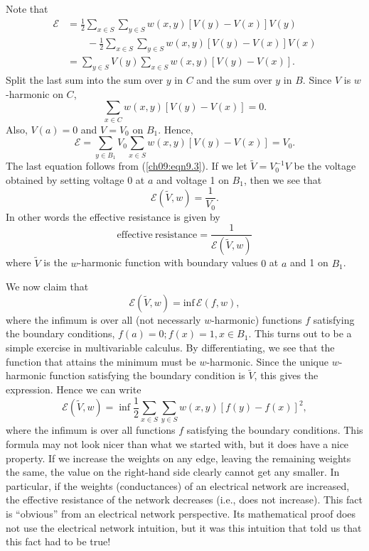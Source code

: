 \documentclass{stml-l}
\theoremstyle{definition}
\numberwithin{equation}{chapter}
\numberwithin{figure}{chapter}
\numberwithin{figure}{section}
\begin{document}
Note that
\begin{align*}
\mathcal{E}&=\frac{1}{2}\sum\limits_{x\in S}\sum\limits_{y\in
S}w(x,y)[V(y)-V(x)]V(y)\\
&\quad\quad-\frac{1}{2}\sum\limits_{x\in S}\sum\limits_{y\in S}w(x,y)[V(y)-V(x)]V(x)\\
&=\sum\limits_{y\in S}V(y)\sum\limits_{x\in S}w(x,y)[V(y)-V(x)].
\end{align*}
Split the last sum into the sum over $y$ in $C$ and the sum over $y$
in $B$. Since $V$ is $w$-harmonic on $C$,
\begin{equation*}
\sum\limits_{x\in C}w(x,y)[V(y)-V(x)]=0.
\end{equation*}
Also, $V(a)=0$ and $V=V_{0}$ on $B_{1}$. Hence,
\begin{equation*}
\mathcal{E}=\sum\limits_{y\in B_{1}}V_{0}\sum\limits_{x\in
S}w(x,y)[V(y)-V(x)]=V_{0}.
\end{equation*}
The last equation follows from (\ref{ch09:eqn9.3}). If we let
$\tilde{V}=V_{0}^{-1}V$ be the voltage obtained by setting voltage
$0$ at $a$ and voltage 1 on $B_{1}$, then we see that
\begin{equation*}
\mathcal{E}(\tilde{V},w)=\frac{1}{V_{0}}.
\end{equation*}
In other words the effective resistance is given by
\begin{equation*}
\mathrm{effective\ resistance} =\frac{1}{\mathcal{E}(\tilde{V},w)}
\end{equation*}
where $\tilde{V}$ is the $w$-harmonic function with boundary values
$0$ at $a$ and 1 on $B_{1}$.

We now claim that
\begin{equation*}
\mathcal{E}(\tilde{V},w)= \mathrm{inf}\,\mathcal{E}(f,w),
\end{equation*}
where the infimum is over all (not necessarly $w$-harmonic)
functions $f$ satisfying the boundary conditions,
$f(a)=0;f(x)=1,x\in B_{1}$. This turns out to be a simple exercise
in multivariable calculus. By differentiating, we see that the
function that attains the minimum must be $w$-harmonic. Since the
unique $w$-harmonic function satisfying the boundary condition is
$\tilde{V}$, this gives the expression. Hence we can write
\begin{equation*}
\mathcal{E}(\tilde{V},w)=\inf\frac{1}{2}\sum\limits_{x\in
S}\sum\limits_{y\in S}w(x,y)[f(y)-f(x)]^{2},
\end{equation*}
where the infimum is over all functions $f$ satisfying the boundary
conditions. This formula may not look nicer than what we started
with, but it does have a nice property. If we increase the weights
on any edge, leaving the remaining weights the same, the value on
the right-hand side clearly cannot get any smaller. In particular,
if the weights (conductances) of an electrical network are
increased, the effective resistance of the network decreases (i.e.,
does not increase). This fact is ``obvious'' from an electrical
network perspective. Its mathematical proof does not use the
electrical network intuition, but it was this intuition that told us
that this fact had to be true!
\end{document}
